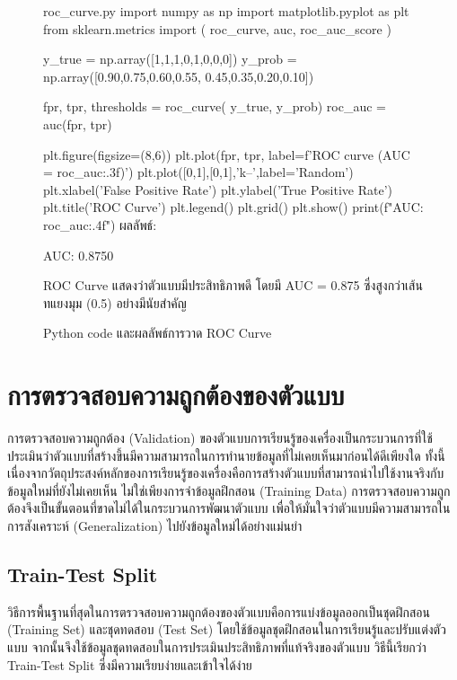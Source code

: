 \begin{figure}[h]
\begin{pycode}{roc\_curve.py}
import numpy as np
import matplotlib.pyplot as plt
from sklearn.metrics import (
    roc_curve, auc, roc_auc_score
)

y_true = np.array([1,1,1,0,1,0,0,0])
y_prob = np.array([0.90,0.75,0.60,0.55,
                   0.45,0.35,0.20,0.10])

fpr, tpr, thresholds = roc_curve(
    y_true, y_prob)
roc_auc = auc(fpr, tpr)

plt.figure(figsize=(8,6))
plt.plot(fpr, tpr,
         label=f'ROC curve (AUC = {roc_auc:.3f})')
plt.plot([0,1],[0,1],'k--',label='Random')
plt.xlabel('False Positive Rate')
plt.ylabel('True Positive Rate')
plt.title('ROC Curve')
plt.legend()
plt.grid()
plt.show()
print(f"AUC: {roc_auc:.4f}")
\tcblower
ผลลัพธ์:

AUC: 0.8750

ROC Curve แสดงว่าตัวแบบมีประสิทธิภาพดี
โดยมี AUC = 0.875 ซึ่งสูงกว่าเส้นทแยงมุม (0.5)
อย่างมีนัยสำคัญ
\end{pycode}
\caption{Python code และผลลัพธ์การวาด ROC Curve}
\label{fig:roc_code}
\end{figure}

\section{การตรวจสอบความถูกต้องของตัวแบบ}
การตรวจสอบความถูกต้อง (Validation) ของตัวแบบการเรียนรู้ของเครื่องเป็นกระบวนการที่ใช้ประเมินว่าตัวแบบที่สร้างขึ้นมีความสามารถในการทำนายข้อมูลที่ไม่เคยเห็นมาก่อนได้ดีเพียงใด ทั้งนี้เนื่องจากวัตถุประสงค์หลักของการเรียนรู้ของเครื่องคือการสร้างตัวแบบที่สามารถนำไปใช้งานจริงกับข้อมูลใหม่ที่ยังไม่เคยเห็น ไม่ใช่เพียงการจำข้อมูลฝึกสอน (Training Data) การตรวจสอบความถูกต้องจึงเป็นขั้นตอนที่ขาดไม่ได้ในกระบวนการพัฒนาตัวแบบ เพื่อให้มั่นใจว่าตัวแบบมีความสามารถในการสังเคราะห์ (Generalization) ไปยังข้อมูลใหม่ได้อย่างแม่นยำ

\subsection{Train-Test Split}
วิธีการพื้นฐานที่สุดในการตรวจสอบความถูกต้องของตัวแบบคือการแบ่งข้อมูลออกเป็นชุดฝึกสอน (Training Set) และชุดทดสอบ (Test Set) โดยใช้ข้อมูลชุดฝึกสอนในการเรียนรู้และปรับแต่งตัวแบบ จากนั้นจึงใช้ข้อมูลชุดทดสอบในการประเมินประสิทธิภาพที่แท้จริงของตัวแบบ วิธีนี้เรียกว่า Train-Test Split ซึ่งมีความเรียบง่ายและเข้าใจได้ง่าย

